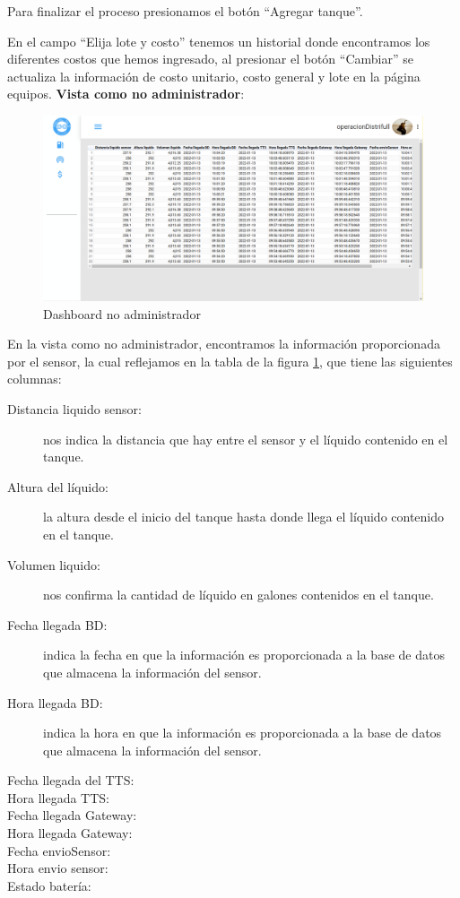 Para finalizar el proceso presionamos el bot\'on ``\textcolor{bluedistri}{Agregar tanque}''.

En el campo ``Elija lote y costo'' tenemos un historial donde encontramos los diferentes costos que hemos ingresado, al presionar el bot\'on ``\textcolor{bluedistri}{Cambiar}'' se actualiza la informaci\'on de costo unitario, costo general y lote en la p\'agina equipos.
\newpage
{\bf Vista como no administrador}:

\begin{figure}[h!]
	\centering
	\includegraphics[width=1\linewidth, height=0.4\textheight]{imagenes/dashboardNoAdmi}
	\caption[Dashboard no admi.]{Dashboard no administrador}
	\label{fig:registro}
\end{figure}

En la vista como no administrador, encontramos la informaci\'on proporcionada por el sensor, la cual reflejamos en la tabla de la figura \ref{fig:registro}, que tiene las siguientes columnas: 

\begin{description}
	\item[Distancia liquido sensor: ] nos indica la distancia que hay entre el sensor y el l\'iquido contenido en el tanque.
	\item[Altura del l\'iquido: ] la altura desde el inicio del tanque hasta donde llega el l\'iquido contenido en el tanque.
	\item[Volumen liquido: ] nos confirma la cantidad de l\'iquido en galones contenidos en el tanque.
	\item[Fecha llegada BD: ] indica la fecha en que la informaci\'on es proporcionada a la base de datos que almacena la informaci\'on del sensor. 
	\item[Hora llegada BD: ] indica la hora en que la informaci\'on es proporcionada a la base de datos que almacena la informaci\'on del sensor.
	\item[Fecha llegada del TTS: ] 
	\item[Hora llegada TTS: ]
	\item[Fecha llegada Gateway: ] 
	\item[Hora llegada Gateway: ]
	\item[Fecha envioSensor: ]
	\item[Hora envio sensor: ]
	\item[Estado bater\'ia: ]
\end{description}


